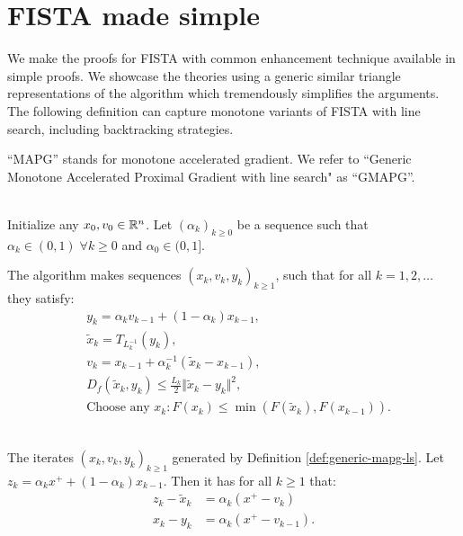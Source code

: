 \documentclass[12pt]{report}
\begin{document}
    \section{FISTA made simple}
        We make the proofs for FISTA  with common enhancement technique available in simple proofs. 
        We showcase the theories using a generic similar triangle representations of the algorithm which tremendously simplifies the arguments. 
        The following definition can capture monotone variants of FISTA with line search, including backtracking strategies. 
        \par
        ``MAPG'' stands for monotone accelerated gradient. 
        We refer to ``Generic Monotone Accelerated Proximal Gradient with line search" as ``GMAPG''. 
        \begin{definition}[GMAPG]\label{def:generic-mapg-ls}\;\\ 
            Initialize any $x_0, v_0 \in \mathbb R^n$. 
            Let $(\alpha_k)_{k \ge 0}$ be a sequence such that $\alpha_k \in (0, 1) \;\forall k \ge 0$ and $\alpha_0 \in (0, 1]$. 
            \begin{tcolorbox}
                The algorithm makes sequences $(x_k, v_k, y_k)_{k \ge 1}$, such that for all $k = 1, 2, \ldots$ they satisfy: 
                \begin{align*}
                    & y_k = \alpha_k v_{k - 1} + (1 - \alpha_k) x_{k - 1}, \\
                    & \tilde x_k = T_{L_k^{-1}}(y_{k}), \\ 
                    & v_k = x_{k - 1} + \alpha_k^{-1}(\tilde x_k - x_{k - 1}), \\
                    & D_{f}(\tilde x_k, y_k) \le \frac{L_k}{2}\Vert \tilde x_k - y_k\Vert^2, \\
                    & \text{Choose any } x_k: F(x_k) \le \min(F(\tilde x_k), F(x_{k - 1})). 
                \end{align*}    
            \end{tcolorbox}
        \end{definition}
        \begin{lemma}\;\label{lemma:apg-iterates}\;\\
            The iterates $(x_k, v_k, y_k)_{k \ge 1}$ generated by Definition \ref{def:generic-mapg-ls}. 
            Let $z_k = \alpha_k x^+ + (1 - \alpha_k)x_{k - 1}$. 
            Then it has for all $k \ge 1$ that: 
            \begin{align*}
                z_k - \tilde x_k &= \alpha_k(x^+ - v_k)
                \\
                x_k - y_k &= \alpha_k(x^+ - v_{k - 1}). 
            \end{align*}
        \end{lemma}
\end{document}
